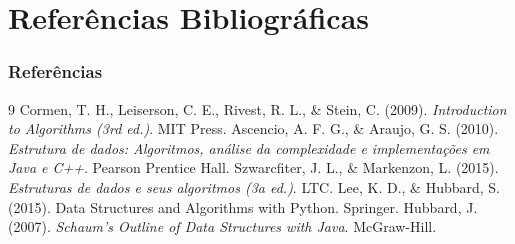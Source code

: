 \documentclass{beamer}
\begin{document}
\section{Referências Bibliográficas}
\begin{frame}[t,allowframebreaks]
\frametitle{Referências}
\begin{thebibliography}{9}
     Cormen, T. H., Leiserson, C. E., Rivest, R. L., \& Stein, C. (2009). \textit{Introduction to Algorithms (3rd ed.)}. MIT Press.
     Ascencio, A. F. G., \& Araujo, G. S. (2010). \textit{Estrutura de dados: Algoritmos, análise da complexidade e implementações em Java e C++}. Pearson Prentice Hall.
     Szwarcfiter, J. L., \& Markenzon, L. (2015). \textit{Estruturas de dados e seus algoritmos (3a ed.)}. LTC.
     Lee, K. D., \& Hubbard, S. (2015). Data Structures and Algorithms with Python. Springer.
     Hubbard, J. (2007). \textit{Schaum’s Outline of Data Structures with Java}. McGraw-Hill.
\end{thebibliography}
\end{frame}

\section{}
\begin{frame}
\titlepage
\end{frame}
\end{document}
